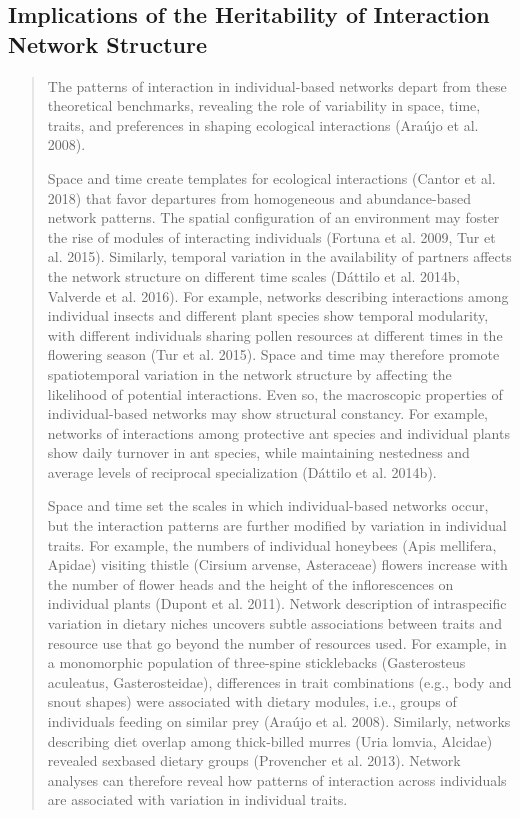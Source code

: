 \documentclass[11pt,twocolumn,twoside,lineno]{pnas-new}
\begin{document}
\subsection*{Implications of the Heritability of Interaction Network Structure}


\begin{quote}

The patterns of interaction in individual-based networks depart from
these theoretical benchmarks, revealing the role of variability in
space, time, traits, and preferences in shaping ecological
interactions (Araújo et al. 2008).

Space and time create templates for ecological interactions (Cantor et
al. 2018) that favor departures from homogeneous and abundance-based
network patterns. The spatial configuration of an environment may
foster the rise of modules of interacting individuals (Fortuna et
al. 2009, Tur et al. 2015). Similarly, temporal variation in the
availability of partners affects the network structure on different
time scales (Dáttilo et al. 2014b, Valverde et al. 2016). For example,
networks describing interactions among individual insects and
different plant species show temporal modularity, with different
individuals sharing pollen resources at different times in the
flowering season (Tur et al. 2015). Space and time may therefore
promote spatiotemporal variation in the network structure by affecting
the likelihood of potential interactions. Even so, the macroscopic
properties of individual-based networks may show structural
constancy. For example, networks of interactions among protective ant
species and individual plants show daily turnover in ant species,
while maintaining nestedness and average levels of reciprocal
specialization (Dáttilo et al. 2014b).  

Space and time set the scales in which individual-based networks
occur, but the interaction patterns are further modified by variation
in individual traits. For example, the numbers of individual honeybees
(Apis mellifera, Apidae) visiting thistle (Cirsium arvense,
Asteraceae) flowers increase with the number of flower heads and the
height of the inflorescences on individual plants (Dupont et
al. 2011). Network description of intraspecific variation in dietary
niches uncovers subtle associations between traits and resource use
that go beyond the number of resources used.  For example, in a
monomorphic population of three-spine sticklebacks (Gasterosteus
aculeatus, Gasterosteidae), differences in trait combinations (e.g.,
body and snout shapes) were associated with dietary modules, i.e.,
groups of individuals feeding on similar prey (Araújo et
al. 2008). Similarly, networks describing diet overlap among
thick-billed murres (Uria lomvia, Alcidae) revealed sexbased dietary
groups (Provencher et al. 2013). Network analyses can therefore reveal
how patterns of interaction across individuals are associated with
variation in individual traits.

\end{quote}
\end{document}
